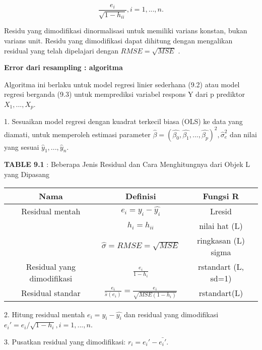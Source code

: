 \documentclass[a4paper,12pt]{article}
\theoremstyle{definition}
\begin{document}
\begin{equation*}
    \frac{e_{i}}{\sqrt{1-h_{ii}}},    i = 1,...,n.
\end{equation*}

Residu yang dimodifikasi dinormalisasi untuk memiliki varians konstan, bukan varians unit. Residu yang dimodifikasi dapat dihitung dengan mengalikan residual yang telah dipelajari dengan $RMSE = \sqrt{MSE}$ .

\textbf{Error dari resampling : algoritma}

Algoritma ini berlaku untuk model regresi linier sederhana (9.2) atau model regresi berganda (9.3) untuk memprediksi variabel respons Y dari p prediktor $X_{1},...,X_{p}$.

1. Sesuaikan model regresi dengan kuadrat terkecil biasa (OLS) ke data yang diamati, untuk memperoleh estimasi parameter $\widehat{\beta } = (\widehat{\beta _{0}}, \widehat{\beta _{1}},...,\widehat{\beta _{p}})^{2},\widehat{\sigma }_{e}^{2}$ dan nilai yang sesuai $\widehat{y}_{1},...,\widehat{y}_{n}$.

\textbf{TABLE 9.1} : Beberapa Jenis Residual dan Cara Menghitungnya dari Objek L yang Dipasang

\begin{table}[h]
\centering
\begin{tabular}{|c c c|}

\hline\hline
Nama & Definisi & Fungsi R \\
\hline
Residual mentah & $e_{i} = y_{i} - \widehat{y_{i}}$ & Lresid\\

& $h_{i} = h_{ii}$ & nilai hat (L)\\

& $\widehat{\sigma} = RMSE = \sqrt{MSE}$ & ringkasan (L) sigma\\

Residual yang dimodifikasi & $\frac{e_{i}}{1-h_{i}}$ & rstandart (L, sd=1)\\

Residual standar & $\frac{e_{i}}{\widehat{s}(e_{i})} = \frac{e_{i}}{\sqrt{MSE(1-h_{i})}}$ & rstandart(L)\\

\hline\hline
\end{tabular}
\end{table}

2. Hitung residual mentah $e_{i} = y_{i} - \widehat{y_{i}}$ dan residual yang dimodifikasi ${e_{i}}' = e_{i}/\sqrt{1-h_{i}}, i = 1,...,n$.

3. Pusatkan residual yang dimodifikasi: $r_{i} = {e_{i}}'- \bar{{e_{i}}'}$.
\end{document}
